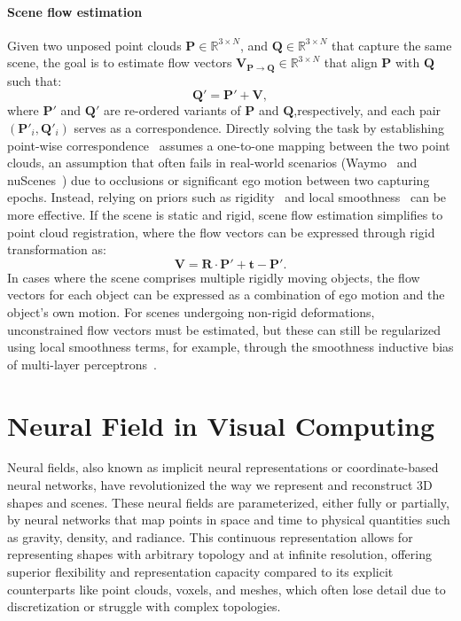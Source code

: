 \paragraph{Scene flow estimation}
Given two unposed point clouds $\mathbf{P} \in \mathbb{R}^{3 \times N} $, and $\mathbf{Q} \in \mathbb{R}^{3 \times N}$ that capture the same scene, the goal is to estimate flow vectors $\mathbf{V}_{\mathbf{P} \rightarrow \mathbf{Q}} \in \mathbb{R}^{3 \times N}$ that align $\mathbf{P}$ with $\mathbf{Q}$ such that:
\begin{equation}
    \mathbf{Q}' = \mathbf{P}' + \mathbf{V},
\end{equation}
where $\mathbf{P}'$ and $\mathbf{Q}'$ are re-ordered variants of $\mathbf{P}$ and $\mathbf{Q}$,respectively, and each pair $(\mathbf{P}'_i, \mathbf{Q}'_i)$ serves as a correspondence. Directly solving the task by establishing point-wise correspondence~\cite{wu2019pointpwc} assumes a one-to-one mapping between the two point clouds, an assumption that often fails in real-world scenarios (\eg Waymo~\cite{sun2020scalability} and nuScenes~\cite{caesar2020nuscenes}) due to occlusions or significant ego motion between two capturing epochs. Instead, relying on priors such as rigidity~\cite{gojcic2021weakly} and local smoothness~\cite{li2020neural} can be more effective. If the scene is static and rigid, scene flow estimation simplifies to point cloud registration, where the flow vectors can be expressed through rigid transformation as:
\begin{equation}
    \mathbf{V} = \mathbf{R}\cdot \mathbf{P}' + \mathbf{t} - \mathbf{P}'.
\end{equation}
In cases where the scene comprises multiple rigidly moving objects, the flow vectors for each object can be expressed as a combination of ego motion and the object's own motion. For scenes undergoing non-rigid deformations, unconstrained flow vectors must be estimated, but these can still be regularized using local smoothness terms, for example, through the smoothness inductive bias of multi-layer perceptrons~\cite{li2020neural,li2023fast}.


\section{Neural Field in Visual Computing}
\label{sec:bg_neural_field}
Neural fields, also known as implicit neural representations or coordinate-based neural networks, have revolutionized the way we represent and reconstruct 3D shapes and scenes. These neural fields are parameterized, either fully or partially, by neural networks that map points in space and time to physical quantities such as gravity, density, and radiance. This continuous representation allows for representing shapes with arbitrary topology and at infinite resolution, offering superior flexibility and representation capacity compared to its explicit counterparts like point clouds, voxels, and meshes, which often lose detail due to discretization or struggle with complex topologies.

